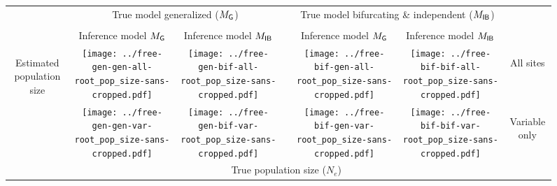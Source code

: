 \documentclass[border=10pt,varwidth=30cm]{standalone}
\newcommand{\genmodel}{\ensuremath{M_{\textrm{\sffamily G}}}\xspace}
\newcommand{\bimodel}{\ensuremath{M_{\textrm{\sffamily IB}}}\xspace}
\begin{document}
\begin{figure}
    \setlength\arrayrulewidth{2pt}
    \centering
    \begin{tabular}{@{}ccccccc@{}}
        & \multicolumn{2}{c}{\LARGE True model generalized (\genmodel)}
        &
        & \multicolumn{2}{c}{\LARGE True model bifurcating \& independent (\bimodel)}
        & \\[1ex]
        \cline{2-3}\cline{5-6}
        & & & & & & \\
        & \multirow{1}{0.19\textwidth}{\centering\Large Inference model \genmodel}
        & \multirow{1}{0.19\textwidth}{\centering\Large Inference model \bimodel}
        &
        & \multirow{1}{0.19\textwidth}{\centering\Large Inference model \genmodel}
        & \multirow{1}{0.19\textwidth}{\centering\Large Inference model \bimodel}
        & \\[4ex]
        \multirow{2}{*}[5em]{\begin{sideways}\Large Estimated population size\end{sideways}}
        & \texttt{[image: ../free-gen-gen-all-root\_pop\_size-sans-cropped.pdf]}
        & \texttt{[image: ../free-gen-bif-all-root\_pop\_size-sans-cropped.pdf]}
        &
        & \texttt{[image: ../free-bif-gen-all-root\_pop\_size-sans-cropped.pdf]}
        & \texttt{[image: ../free-bif-bif-all-root\_pop\_size-sans-cropped.pdf]}
        & \multirow{1}{*}[9em]{\begin{sideways}\Large All sites\end{sideways}} \\
        & \texttt{[image: ../free-gen-gen-var-root\_pop\_size-sans-cropped.pdf]}
        & \texttt{[image: ../free-gen-bif-var-root\_pop\_size-sans-cropped.pdf]}
        &
        & \texttt{[image: ../free-bif-gen-var-root\_pop\_size-sans-cropped.pdf]}
        & \texttt{[image: ../free-bif-bif-var-root\_pop\_size-sans-cropped.pdf]}
        & \multirow{1}{*}[10em]{\begin{sideways}\Large Variable only\end{sideways}} \\
        & \multicolumn{5}{c}{\Large True population size ($N_e$)} & \\
    \end{tabular}
\end{figure}
\end{document}
